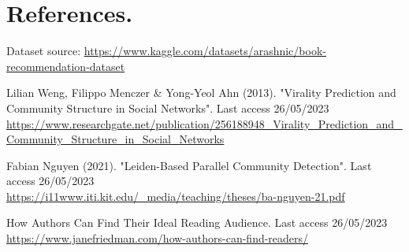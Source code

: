 \newpage
\section*{References.}
\renewcommand\refname{}
%


\begin{thebibliography}{00}






Dataset source: \url{ https://www.kaggle.com/datasets/arashnic/book-recommendation-dataset}

Lilian Weng, Filippo Menczer & Yong-Yeol Ahn (2013). "Virality Prediction and Community Structure in Social Networks". Last access 26/05/2023\\
\url{https://www.researchgate.net/publication/256188948_Virality_Prediction_and_Community_Structure_in_Social_Networks}

Fabian Nguyen (2021). "Leiden-Based Parallel Community Detection". Last access 26/05/2023\\
\url{https://i11www.iti.kit.edu/_media/teaching/theses/ba-nguyen-21.pdf}

How Authors Can Find Their Ideal Reading Audience. Last access 26/05/2023\\
\url{https://www.janefriedman.com/how-authors-can-find-readers/}

\end{thebibliography}
